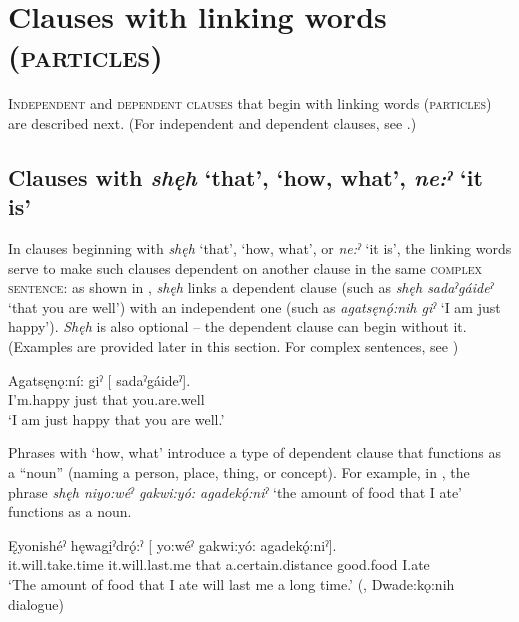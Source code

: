 \chapter[Clauses with linking words \textup{(}\textsc{particles}\textup{)}]{Clauses with linking words (\textsc{particles})} \label{ch:Clauses with linking words}
\textsc{Independent} and \textsc{dependent clauses} that begin with linking words (\textsc{particles}) are described next. (For independent and dependent clauses, see .)


\section{Clauses with \textit{shęh} ‘that’,  ‘how, what’, \textit{ne:ˀ} ‘it is’} \label{ch:Clauses with [shęh] ‘that’, [shęh ni-] ‘how, what’, [ne:ˀ] ‘it is’}
In clauses beginning with \textit{shęh} ‘that’,  ‘how, what’, or \textit{ne:ˀ} ‘it is’, the linking words serve to make such clauses dependent on another clause in the same \textsc{complex sentence}: as shown in , \textit{shęh} links a dependent clause (such as \textit{shęh sadaˀgáideˀ} ‘that you are well’) with an independent one (such as \textit{agatsęnǫ́:nih giˀ} ‘I am just happy’). \textit{Shęh} is also optional -- the dependent clause can begin without it. (Examples are provided later in this section. For complex sentences, see \pageref{Simple and complex sentences, clause types})

\ea\label{ex:shesuborex}
\gll Agatsęnǫ:ní: giˀ [ sadaˀgáideˀ]. \\
I’m.happy just that you.are.well\\
\glt ‘I am just happy that you are well.’ 
\z

Phrases with  ‘how, what’ introduce a type of dependent clause that functions as a “noun” (naming a person, place, thing, or concept). For example, in , the phrase \textit{shęh niyo:wéˀ gakwi:yó: agadekǫ́:niˀ} ‘the amount of food that I ate’ functions as a noun.

\ea\label{ex:howwhatex4}
\gll Ęyonishéˀ hęwagi̱ˀdrǫ́:ˀ  [  yo:wéˀ  gakwi:yó:  agadekǫ́:niˀ]. \\
it.will.take.time it.will.last.me that a.certain.distance good.food I.ate\\
\glt ‘The amount of food that I ate will last me a long time.’ (\cite[294]{mithun_watewayestanih_1984}, Dwade:kǫ:nih dialogue)
\z


